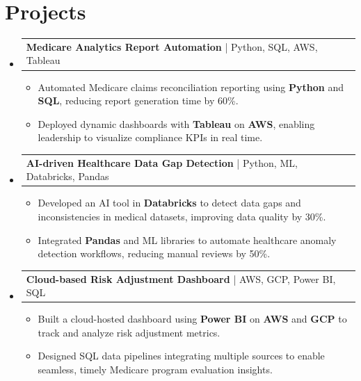 \documentclass[letterpaper,11pt]{article}
\makeatletter
\newcommand{\resumeItem}[1]{
  \item\footnotesize{
    {#1 \vspace{-2pt}}
  }
}
\newcommand{\resumeProjectHeading}[2]{
    \item
    \begin{tabular*}{1.001\textwidth}{l@{\extracolsep{\fill}}r}
      \small#1 & \textbf{\small #2}\\
    \end{tabular*}\vspace{-7pt}
}
\newcommand{\resumeSubHeadingListStart}{\begin{itemize}[leftmargin=0pt, label={}]}
\newcommand{\resumeSubHeadingListEnd}{\end{itemize}}
\newcommand{\resumeItemListStart}{\begin{itemize}[leftmargin=*]}
\newcommand{\resumeItemListEnd}{\end{itemize}\vspace{-5pt}}
\makeatother
\begin{document}
\section{Projects}
    \vspace{-5pt}
    \resumeSubHeadingListStart
          \resumeProjectHeading
              {\textbf{Medicare Analytics Report Automation} | Python, SQL, AWS, Tableau}{}
        \resumeItemListStart
            \resumeItem{Automated Medicare claims reconciliation reporting using \textbf{Python} and \textbf{SQL}, reducing report generation time by 60\%.}
            \resumeItem{Deployed dynamic dashboards with \textbf{Tableau} on \textbf{AWS}, enabling leadership to visualize compliance KPIs in real time.}
        \resumeItemListEnd
        \vspace{-12pt}
    
    \resumeProjectHeading
        {\textbf{AI-driven Healthcare Data Gap Detection} | Python, ML, Databricks, Pandas}{}
        \resumeItemListStart
            \resumeItem{Developed an AI tool in \textbf{Databricks} to detect data gaps and inconsistencies in medical datasets, improving data quality by 30\%.}
            \resumeItem{Integrated \textbf{Pandas} and ML libraries to automate healthcare anomaly detection workflows, reducing manual reviews by 50\%.}
        \resumeItemListEnd
          \vspace{-12pt}
      \resumeProjectHeading
          {\textbf{Cloud-based Risk Adjustment Dashboard} | AWS, GCP, Power BI, SQL}{}
          \resumeItemListStart
              \resumeItem{Built a cloud-hosted dashboard using \textbf{Power BI} on \textbf{AWS} and \textbf{GCP} to track and analyze risk adjustment metrics.}
              \resumeItem{Designed SQL data pipelines integrating multiple sources to enable seamless, timely Medicare program evaluation insights.}
          \resumeItemListEnd 
    \resumeSubHeadingListEnd
\end{document}
